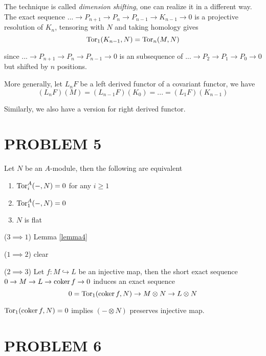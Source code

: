 \begin{remark}
	\label{dimshift1}
	The technique is called \textit{dimension shifting}, one can realize it in a different way. The exact sequence $... \to P_{n+1} \to P_n \to P_{n-1} \to K_{n-1} \to 0$ is a projective resolution of $K_n$, tensoring with $N$ and taking homology gives
	$$
	\operatorname{Tor}_1(K_{n-1}, N) = \operatorname{Tor}_n(M, N)
	$$
	
	since $... \to P_{n+1} \to P_n \to P_{n-1} \to 0$ is an subsequence of $... \to P_2 \to P_1 \to P_0 \to 0$ but shifted by $n$ positions.
	
	More generally, let $L_n F$ be a left derived functor of a covariant functor, we have
	$$
		(L_n F)(M) = (L_{n-1} F)(K_0) = ... = (L_1 F)(K_{n-1})
	$$
	
	Similarly, we also have a version for right derived functor.
\end{remark}

\section{PROBLEM 5}

\begin{problem}[problem 5]
	Let $N$ be an $A$-module, then the following are equivalent
	\begin{enumerate}
		\item $\operatorname{Tor}_i^A(-, N) = 0$ for any $i \geq 1$
		\item $\operatorname{Tor}_1^A(-, N) = 0$
		\item $N$ is flat
	\end{enumerate}
\end{problem}

\begin{longproof}
	($3 \implies 1$) Lemma \ref{lemma4}
	
	($1 \implies 2$) clear
	
	($2 \implies 3$) Let $f: M \hookrightarrow L$ be an injective map, then the short exact sequence $0 \to M \to L \to \operatorname{coker} f \to 0$ induces an exact sequence
	$$
		0 = \operatorname{Tor}_1(\operatorname{coker} f, N) \to M \otimes N \to L \otimes N
	$$
	
	$\operatorname{Tor}_1(\operatorname{coker} f, N) = 0$ implies $(- \otimes N)$ preserves injective map.
\end{longproof}

\section{PROBLEM 6}

